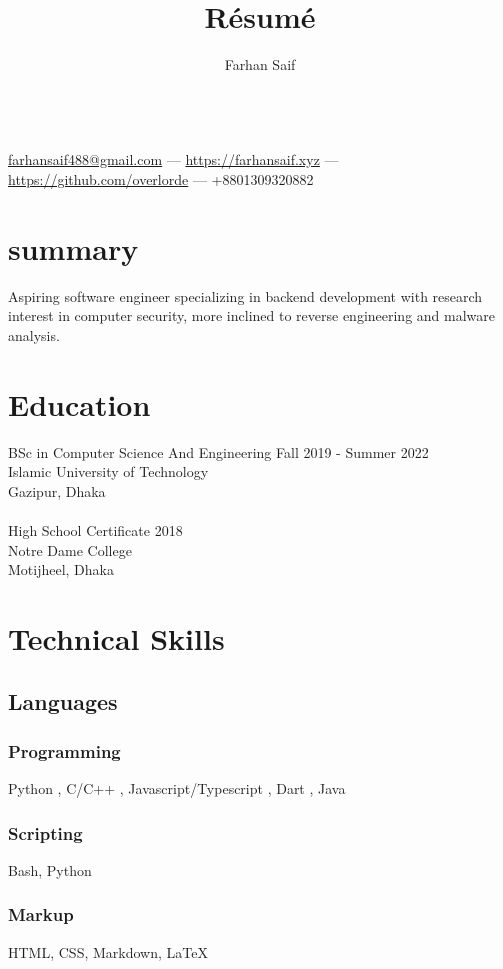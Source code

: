 \documentclass[a4paper,8pt]{extarticle}
\makeatletter
\renewcommand{\maketitle}{
\begin{center}
{\huge\bfseries
\theauthor}
\vspace{0.25em}
\\
	\href{farhansaif488@gmail.com}{farhansaif488@gmail.com} --- \href{https://farhansaif.xyz}{https://farhansaif.xyz} --- \href{https://github.com/overlorde}{https://github.com/overlorde} --- +8801309320882
\end{center}
}
\makeatother
\begin{document}
\title{R\'esum\'e}

\author{Farhan Saif}

\maketitle

\section{summary}
Aspiring software engineer specializing in backend development with research interest in computer security, more inclined to reverse engineering and malware analysis.

\section{Education}
BSc in Computer Science And Engineering \hspace{6cm} Fall 2019 - Summer 2022\\
Islamic University of Technology\\
Gazipur, Dhaka\\ \\
High School Certificate \hspace{11cm} 2018\\
Notre Dame College\\
Motijheel, Dhaka\\






\section{Technical Skills}
\subsection{Languages }
\subsubsection{Programming}
Python , C/C++ , Javascript/Typescript , Dart , Java
\subsubsection{Scripting}
Bash, Python
\subsubsection{Markup}
HTML, CSS, Markdown, {\LaTeX}
\end{document}
